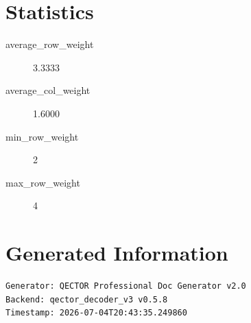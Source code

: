 \documentclass[11pt]{article}
\begin{document}
\section{Statistics}

\begin{description}
\item[average_row_weight] 3.3333
\item[average_col_weight] 1.6000
\item[min_row_weight] 2
\item[max_row_weight] 4
\end{description}

\section*{Generated Information}

\begin{verbatim}
Generator: QECTOR Professional Doc Generator v2.0
Backend: qector_decoder_v3 v0.5.8
Timestamp: 2026-07-04T20:43:35.249860
\end{verbatim}
\end{document}
